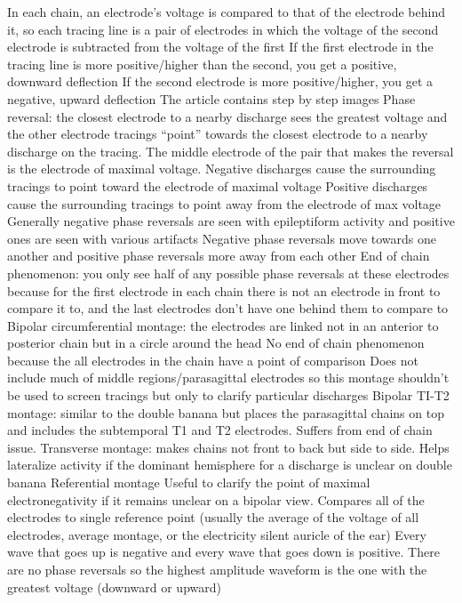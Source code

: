 \documentclass[12pt]{article}
\begin{document}
In each chain, an electrode’s voltage is compared to that of the electrode behind it, so each tracing line is a pair of electrodes in which the voltage of the second electrode is subtracted from the voltage of the first 
If the first electrode in the tracing line is more positive/higher than the second, you get a positive, downward deflection
If the second electrode is more positive/higher, you get a negative, upward deflection
The article contains step by step images 
Phase reversal: the closest electrode to a nearby discharge sees the greatest voltage and the other electrode tracings “point” towards the closest electrode to a nearby discharge on the tracing.
The middle electrode of the pair that makes the reversal is the electrode of maximal voltage.
Negative discharges cause the surrounding tracings to point toward the electrode of maximal voltage
Positive discharges cause the surrounding tracings to point away from the electrode of max voltage 
Generally negative phase reversals are seen with epileptiform activity and positive ones are seen with various artifacts
Negative phase reversals move towards one another and positive phase reversals more away from each other
End of chain phenomenon: you only see half of any possible phase reversals at these electrodes because for the first electrode in each chain there is not an electrode in front to compare it to, and the last electrodes don’t have one behind them to compare to
Bipolar circumferential montage: the electrodes are linked not in an anterior to posterior chain but in a circle around the head
No end of chain phenomenon because the all electrodes in the chain have a point of comparison 
Does not include much of middle regions/parasagittal electrodes so this montage shouldn’t be used to screen tracings but only to clarify particular discharges 
Bipolar TI-T2 montage: similar to the double banana but places the parasagittal chains on top and includes the subtemporal T1 and T2 electrodes. Suffers from end of chain issue.
Transverse montage: makes chains not front to back but side to side. Helps lateralize activity if the dominant hemisphere for a discharge is unclear on double banana
Referential montage 
Useful to clarify the point of maximal electronegativity if it remains unclear on a bipolar view.
Compares all of the electrodes to single reference point (usually the average of the voltage of all electrodes, average montage, or the electricity silent auricle of the ear)
Every wave that goes up is negative and every wave that goes down is positive. 
There are no phase reversals so the highest amplitude waveform is the one with the greatest voltage (downward or upward)
\end{document}
